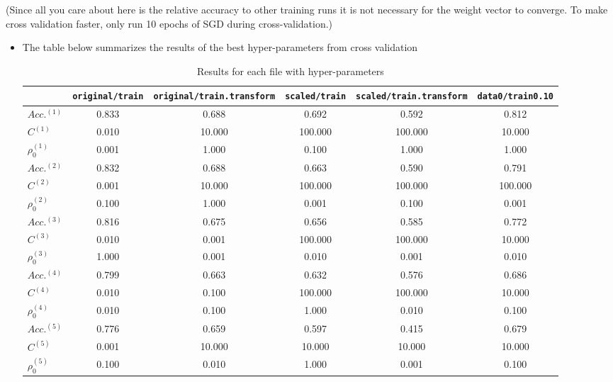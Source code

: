 \begin{enumerate}
  (Since all you care about here is the relative accuracy to other
  training runs it is not necessary for the weight vector to converge.
  To make cross validation faster, only run 10 epochs of SGD during
  cross-validation.)

\begin{itemize}
\item The table below summarizes the results of the best hyper-parameters from cross validation

\begin{table}[!h]
\centering
\caption{Results for each file with hyper-parameters}
\begin{tabular}{l | c | c | c | c | c}
\hline\hline
& {\tiny \verb~original/train~} & {\tiny \verb~original/train.transform~} & {\tiny \verb~scaled/train~} & {\tiny \verb~scaled/train.transform~} & {\tiny \verb~data0/train0.10~}\\
\hline
$Acc.^{(1)}$ & 0.833 & \phantom{1}0.688 & \phantom{10}0.692 & \phantom{10}0.592 & \phantom{10}0.812 \\
$C^{(1)}$ & 0.010 &  10.000& 100.000& 100.000& \phantom{1}10.000\\
$\rho_{0}^{(1)}$ & 0.001 & \phantom{1}1.000 & \phantom{10}0.100 & \phantom{10}1.000 & \phantom{10}1.000\\
\hline
$Acc.^{(2)}$ & 0.832 & \phantom{1}0.688 & \phantom{10}0.663 & \phantom{10}0.590 & \phantom{10}0.791\\
$C^{(2)}$ & 0.001 & 10.000 & 100.000& 100.000& 100.000\\
$\rho_{0}^{(2)}$ & 0.100 & \phantom{1}1.000 & \phantom{10}0.001 & \phantom{10}0.100 & \phantom{10}0.001\\
\hline
$Acc.^{(3)}$ & 0.816 & \phantom{1}0.675 & \phantom{10}0.656 & \phantom{10}0.585 & \phantom{10}0.772\\
$C^{(3)}$ & 0.010 & \phantom{1}0.001 & 100.000& 100.000& \phantom{1}10.000\\
$\rho_{0}^{(3)}$ & 1.000 & \phantom{1}0.001 & \phantom{10}0.010 & \phantom{10}0.001 & \phantom{10}0.010\\
\hline
$Acc.^{(4)}$ & 0.799 & \phantom{1}0.663 & \phantom{10}0.632 & \phantom{10}0.576 & \phantom{10}0.686\\
$C^{(4)}$ & 0.010 & 0.100 & 100.000& 100.000& \phantom{1}10.000\\
$\rho_{0}^{(4)}$ & 0.010 & \phantom{1}0.100 & \phantom{10}1.000 & \phantom{10}0.010 & \phantom{10}0.100\\
\hline
$Acc.^{(5)}$ & 0.776 & \phantom{1}0.659 & \phantom{10}0.597 & \phantom{10}0.415 & \phantom{10}0.679\\
$C^{(5)}$ & 0.001 & 10.000 & \phantom{10}10.000& \phantom{10}10.000& \phantom{10}10.000\\
$\rho_{0}^{(5)}$ & 0.100 & \phantom{1}0.010 & \phantom{10}1.000 & \phantom{10}0.001 & \phantom{10}0.100\\
\hline


\end{tabular}
\end{table}
\end{itemize}
\end{enumerate}
